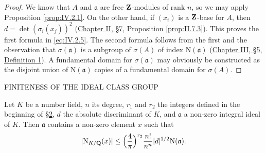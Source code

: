 \begin{proof}
We know that $A$ and $\mathfrak{a}$ are free $\mathbf{Z}$-modules of rank $n$, so we
may apply Proposition \ref{prop:IV.2.1}. On the other hand, if $(x_{i})$ is
a $\mathbf{Z}$-base for $A$, then $d=\det(\sigma_{i}(x_{j}))^{2}$ (\hyperref[sec:2.7]{Chapter II, §7},
Proposition \ref{prop:II.7.3}). This proves the first formula in
\eqref{eq:IV.2.5}. The second formula follows from the first and the
observation that $\sigma(\mathfrak{a})$ is a subgroup of $\sigma(A)$ of
index $\mathrm{N}(\mathfrak{a})$ (\hyperref[sec:3.5]{Chapter III, §5}, \hyperref[def:III.5.1]{Definition 1}). A fundamental
domain for $\sigma(\mathfrak{a})$ may obviously be constructed as the
disjoint union of $\mathrm{N}(\mathfrak{a})$ copies of a fundamental domain for
$\sigma(A)$.
\end{proof}

%
        {FINITENESS OF THE IDEAL CLASS GROUP}

\begin{proposition}
\label{prop:IV.3.1}
Let $K$ be a number field, $n$ its degree, $r_{1}$ and $r_{2}$ the integers
defined in the beginning of \hyperref[sec:4.2]{§2}, $d$ the absolute discriminant of $K$, and
$\mathfrak{a}$ a non-zero integral ideal of $K$. Then $\mathfrak{a}$ contains
a non-zero element $x$ such that
\begin{equation}
|\mathrm{N}_{K/\mathbf{Q}}(x)|\leq\Bigl(\frac{4}{\pi}\Bigr)^{r_{2}}\frac{n!}{n^{n}}
|d|^{1/2}\mathrm{N}(\mathfrak{a}).
\label{eq:IV.3.1}
\end{equation}
\end{proposition}

